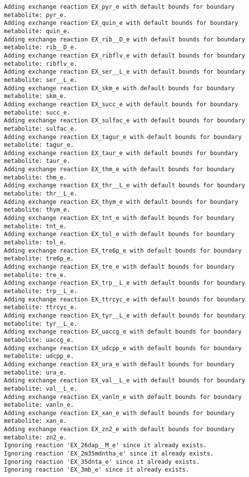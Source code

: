 \documentclass[
  letterpaper,
  DIV=11,
  numbers=noendperiod]{scrartcl}
\begin{document}
\begin{verbatim}
Adding exchange reaction EX_pyr_e with default bounds for boundary metabolite: pyr_e.
Adding exchange reaction EX_quin_e with default bounds for boundary metabolite: quin_e.
Adding exchange reaction EX_rib__D_e with default bounds for boundary metabolite: rib__D_e.
Adding exchange reaction EX_ribflv_e with default bounds for boundary metabolite: ribflv_e.
Adding exchange reaction EX_ser__L_e with default bounds for boundary metabolite: ser__L_e.
Adding exchange reaction EX_skm_e with default bounds for boundary metabolite: skm_e.
Adding exchange reaction EX_succ_e with default bounds for boundary metabolite: succ_e.
Adding exchange reaction EX_sulfac_e with default bounds for boundary metabolite: sulfac_e.
Adding exchange reaction EX_tagur_e with default bounds for boundary metabolite: tagur_e.
Adding exchange reaction EX_taur_e with default bounds for boundary metabolite: taur_e.
Adding exchange reaction EX_thm_e with default bounds for boundary metabolite: thm_e.
Adding exchange reaction EX_thr__L_e with default bounds for boundary metabolite: thr__L_e.
Adding exchange reaction EX_thym_e with default bounds for boundary metabolite: thym_e.
Adding exchange reaction EX_tnt_e with default bounds for boundary metabolite: tnt_e.
Adding exchange reaction EX_tol_e with default bounds for boundary metabolite: tol_e.
Adding exchange reaction EX_tre6p_e with default bounds for boundary metabolite: tre6p_e.
Adding exchange reaction EX_tre_e with default bounds for boundary metabolite: tre_e.
Adding exchange reaction EX_trp__L_e with default bounds for boundary metabolite: trp__L_e.
Adding exchange reaction EX_ttrcyc_e with default bounds for boundary metabolite: ttrcyc_e.
Adding exchange reaction EX_tyr__L_e with default bounds for boundary metabolite: tyr__L_e.
Adding exchange reaction EX_uaccg_e with default bounds for boundary metabolite: uaccg_e.
Adding exchange reaction EX_udcpp_e with default bounds for boundary metabolite: udcpp_e.
Adding exchange reaction EX_ura_e with default bounds for boundary metabolite: ura_e.
Adding exchange reaction EX_val__L_e with default bounds for boundary metabolite: val__L_e.
Adding exchange reaction EX_vanln_e with default bounds for boundary metabolite: vanln_e.
Adding exchange reaction EX_xan_e with default bounds for boundary metabolite: xan_e.
Adding exchange reaction EX_zn2_e with default bounds for boundary metabolite: zn2_e.
Ignoring reaction 'EX_26dap__M_e' since it already exists.
Ignoring reaction 'EX_2m35mdntha_e' since it already exists.
Ignoring reaction 'EX_35dnta_e' since it already exists.
Ignoring reaction 'EX_3mb_e' since it already exists.

\end{verbatim}
\end{document}
